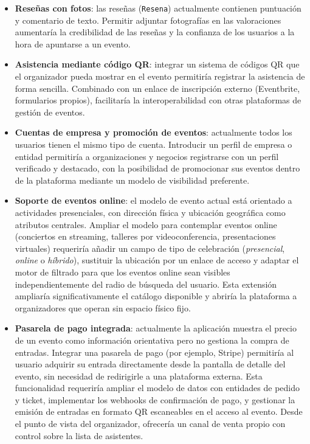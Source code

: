 \begin{itemize}
    \item \textbf{Reseñas con fotos}: las reseñas (\texttt{Resena}) actualmente contienen puntuación y comentario de texto. Permitir adjuntar fotografías en las valoraciones aumentaría la credibilidad de las reseñas y la confianza de los usuarios a la hora de apuntarse a un evento.

    \item \textbf{Asistencia mediante código QR}: integrar un sistema de códigos QR que el organizador pueda mostrar en el evento permitiría registrar la asistencia de forma sencilla. Combinado con un enlace de inscripción externo (Eventbrite, formularios propios), facilitaría la interoperabilidad con otras plataformas de gestión de eventos.

    \item \textbf{Cuentas de empresa y promoción de eventos}: actualmente todos los usuarios tienen el mismo tipo de cuenta. Introducir un perfil de empresa o entidad permitiría a organizaciones y negocios registrarse con un perfil verificado y destacado, con la posibilidad de promocionar sus eventos dentro de la plataforma mediante un modelo de visibilidad preferente.

    \item \textbf{Soporte de eventos online}: el modelo de evento actual está orientado a actividades presenciales, con dirección física y ubicación geográfica como atributos centrales. Ampliar el modelo para contemplar eventos online (conciertos en streaming, talleres por videoconferencia, presentaciones virtuales) requeriría añadir un campo de tipo de celebración (\textit{presencial}, \textit{online} o \textit{híbrido}), sustituir la ubicación por un enlace de acceso y adaptar el motor de filtrado para que los eventos online sean visibles independientemente del radio de búsqueda del usuario. Esta extensión ampliaría significativamente el catálogo disponible y abriría la plataforma a organizadores que operan sin espacio físico fijo.

    \item \textbf{Pasarela de pago integrada}: actualmente la aplicación muestra el precio de un evento como información orientativa pero no gestiona la compra de entradas. Integrar una pasarela de pago (por ejemplo, Stripe) permitiría al usuario adquirir su entrada directamente desde la pantalla de detalle del evento, sin necesidad de redirigirle a una plataforma externa. Esta funcionalidad requeriría ampliar el modelo de datos con entidades de pedido y ticket, implementar los webhooks de confirmación de pago, y gestionar la emisión de entradas en formato QR escaneables en el acceso al evento. Desde el punto de vista del organizador, ofrecería un canal de venta propio con control sobre la lista de asistentes.


\end{itemize}
